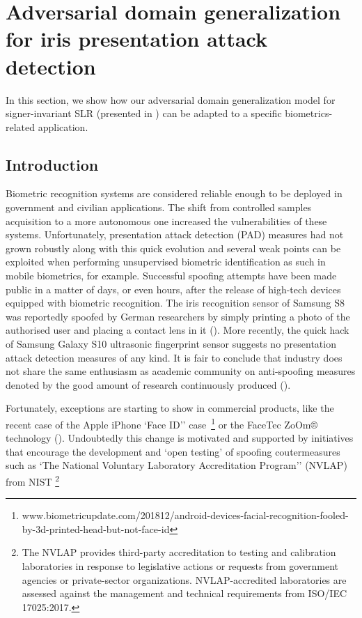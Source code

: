 \section{Adversarial domain generalization for iris presentation attack detection}
\label{sec:adv_iris_attack}
In this section, we show how our adversarial domain generalization model for signer-invariant SLR (presented in ) can be adapted to a specific biometrics-related application.

\subsection{Introduction}
\label{sec:adv_iris_attack_intro}
Biometric recognition systems are considered reliable enough to be deployed in government and civilian applications. The shift from controlled samples acquisition to a more autonomous one increased the vulnerabilities of these systems. Unfortunately, presentation attack detection (PAD) measures had not grown robustly along with this quick evolution and several weak points can be exploited when performing unsupervised biometric identification as such in mobile biometrics, for example. Successful spoofing attempts have been made public in a matter of days, or even hours, after the release of high-tech devices equipped with biometric recognition. The iris recognition sensor of Samsung S8 was reportedly spoofed by German researchers by simply printing a photo of the authorised user and placing a contact lens in it (\citet{cccsamsung2017}). More recently, the quick hack of Samsung Galaxy S10 ultrasonic fingerprint sensor suggests no presentation attack detection measures of any kind. It is fair to conclude that industry does not share the same enthusiasm as academic community on anti-spoofing measures denoted by the good amount of research continuously produced (\citet{raghavendra2015VSIA,czajka2018irisPADreview,Galbally2019,scherhag2019}).

Fortunately, exceptions are starting to show in commercial products, like the recent case of the Apple iPhone `Face ID'' case~\footnote{www.biometricupdate.com/201812/android-devices-facial-recognition-fooled-by-3d-printed-head-but-not-face-id} or the FaceTec ZoOm® technology (\citet{facetec102019}). Undoubtedly this change is motivated and supported by initiatives that encourage the development and `open testing' of spoofing coutermeasures such as `The National Voluntary Laboratory Accreditation Program'' (NVLAP) from NIST \footnote{The NVLAP provides third-party accreditation to testing and calibration laboratories in response to legislative actions or requests from government agencies or private-sector organizations. NVLAP-accredited laboratories are assessed against the management and technical requirements from ISO/IEC 17025:2017.}


